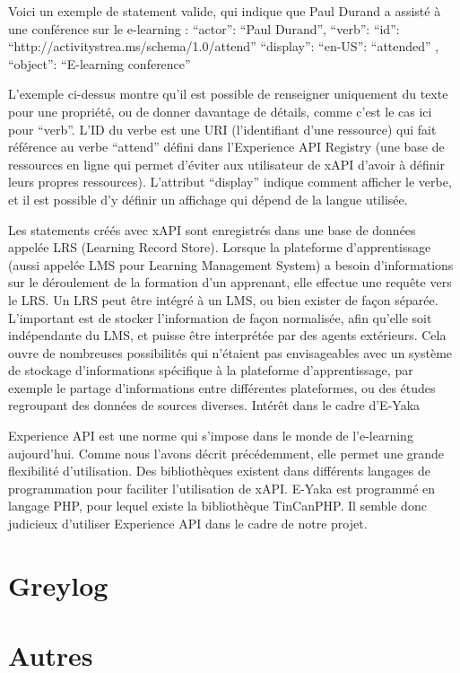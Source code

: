 Voici un exemple de statement valide, qui indique que Paul Durand a assisté à une conférence sur le e-learning :
{
    “actor”: “Paul Durand”,
    “verb”: {
        “id”: “http://activitystrea.ms/schema/1.0/attend”
        “display”: { “en-US”: “attended” }
    },
    “object”: “E-learning conference”
}

L’exemple ci-dessus montre qu’il est possible de renseigner uniquement du texte pour une propriété, ou de donner davantage de détails, comme c’est le cas ici pour “verb”. L’ID du verbe est une URI (l’identifiant d’une ressource) qui fait référence au verbe “attend” défini dans l’Experience API Registry (une base de ressources en ligne qui permet d’éviter aux utilisateur de xAPI d’avoir à définir leurs propres ressources). L’attribut “display” indique comment afficher le verbe, et il est possible d’y définir un affichage qui dépend de la langue utilisée.

Les statements créés avec xAPI sont enregistrés dans une base de données appelée LRS (Learning Record Store). Lorsque la plateforme d’apprentissage (aussi appelée LMS pour Learning Management System) a besoin d’informations sur le déroulement de la formation d’un apprenant, elle effectue une requête vers le LRS.
Un LRS peut être intégré à un LMS, ou bien exister de façon séparée. L’important est de stocker l’information de façon normalisée, afin qu’elle soit indépendante du LMS, et puisse être interprétée par des agents extérieurs. Cela ouvre de nombreuses possibilités qui n’étaient pas envisageables avec un système de stockage d’informations spécifique à la plateforme d’apprentissage, par exemple le partage d’informations entre différentes plateformes, ou des études regroupant des données de sources diverses.
Intérêt dans le cadre d’E-Yaka

Experience API est une norme qui s’impose dans le monde de l’e-learning aujourd’hui. Comme nous l’avons décrit précédemment, elle permet une grande flexibilité d’utilisation.
Des bibliothèques existent dans différents langages de programmation pour faciliter l’utilisation de xAPI. E-Yaka est programmé en langage PHP, pour lequel existe la bibliothèque TinCanPHP.
Il semble donc judicieux d’utiliser Experience API dans le cadre de notre projet.


    \section{Greylog  }
    \section{Autres  }
